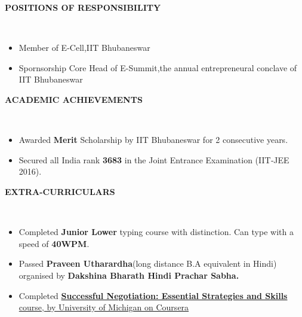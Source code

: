 \documentclass[a4paper,10pt]{article}
\newcommand{\lsep}{-0.5cm}
\newcommand{\resheading}[1]{{\small \colorbox{mygrey}{\begin{minipage}{0.975\textwidth}{\textbf{#1 \vphantom{p\^{E}}}}\end{minipage}}}}
\begin{document}
\resheading{\textbf{POSITIONS OF RESPONSIBILITY} }\\[\lsep]
\begin{itemize}
\item \noindent Member of E-Cell,IIT Bhubaneswar
\item \noindent Spornsorship Core Head of E-Summit,the annual entrepreneural conclave of IIT Bhubaneswar
\end{itemize}

\resheading{\textbf{ACADEMIC ACHIEVEMENTS} }\\[\lsep]
\begin{itemize}
\item \noindent Awarded \textbf{Merit} Scholarship by IIT Bhubaneswar for 2 consecutive years.
\item \noindent Secured all India rank \textbf{3683} in the Joint Entrance Examination (IIT‐JEE 2016). 
\end{itemize}

\resheading{\textbf{EXTRA-CURRICULARS} }\\[\lsep]
\begin{itemize}
\item \noindent Completed  \textbf {Junior Lower} typing course with distinction. Can type with a speed of \textbf{40WPM}.  
\item \noindent Passed \textbf{Praveen Utharardha}(long distance B.A equivalent in Hindi) organised by \textbf{Dakshina Bharath Hindi Prachar Sabha.} 
\item \noindent Completed \href{https://www.coursera.org/account/accomplishments/certificate/MVNXF4M8MJ76}{\textbf{Successful Negotiation: Essential Strategies and
Skills} course, by University of Michigan on Coursera}
\end{itemize}
\end{document}
